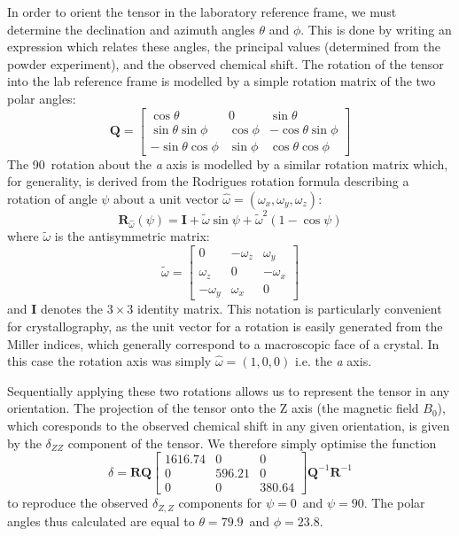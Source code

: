 \begin{refsection}
In order to orient the tensor in the laboratory reference frame, we must determine the declination and azimuth angles $\theta$ and $\phi$.
This is done by writing an expression which relates these angles, the principal values (determined from the powder experiment), and the observed chemical shift.
The rotation of the tensor into the lab reference frame is modelled by a simple rotation matrix of the two polar angles:
\begin{equation}
  \mathbf{Q} = \begin{bmatrix} \cos\theta & 0 & \sin\theta \\ \sin\theta\sin\phi  & \cos\phi & -\cos\theta\sin\phi \\ -\sin\theta\cos\phi & \sin\phi & \cos\theta\cos\phi \end{bmatrix}
\end{equation}
The 90\degree\ rotation about the \textit{a} axis is modelled by a similar rotation matrix which, for generality, is derived from the Rodrigues rotation formula describing a rotation of angle $\psi$ about a unit vector $\hat{\omega} = \left( \omega_{x}, \omega_{y}, \omega_{z} \right)$:
\begin{equation}
  \mathbf{R}_{\hat{\omega}}(\psi) = \mathbf{I} + \tilde{\omega}\sin\psi + \tilde{\omega}^{2}(1-\cos\psi)
\end{equation}
where $\tilde{\omega}$ is the antisymmetric matrix:
\begin{equation}
  \tilde{\omega} = \begin{bmatrix} 0 & -\omega_{z} & \omega_{y} \\ \omega_{z} & 0 & -\omega_{x} \\ -\omega_{y} & \omega_{x} & 0 \end{bmatrix}
\end{equation}
and $\mathbf{I}$ denotes the $3\times 3$ identity matrix.
This notation is particularly convenient for crystallography, as the unit vector for a rotation is easily generated from the Miller indices, which generally correspond to a macroscopic face of a crystal.
In this case the rotation axis was simply $\hat{\omega} = (1,0,0)$ i.e. the \textit{a} axis.

Sequentially applying these two rotations allows us to represent the tensor in any orientation.
The projection of the tensor onto the Z axis (the magnetic field $B_{0}$), which coresponds to the observed chemical shift in any given orientation, is given by the $\delta_{ZZ}$ component of the tensor.
We therefore simply optimise the function
\begin{equation}
  \delta = \mathbf{R} \mathbf{Q} \begin{bmatrix} 1616.74 & 0 & 0 \\ 0 & 596.21 & 0 \\ 0 & 0 & 380.64 \end{bmatrix} \mathbf{Q}^{-1} \mathbf{R}^{-1}
\end{equation}
to reproduce the observed $\delta_{Z,Z}$ components for $\psi = 0$\degree\ and $\psi = 90$\degree.
The polar angles thus calculated are equal to $\theta = 79.9$\degree\ and $\phi = 23.8$\degree.


\end{refsection}
